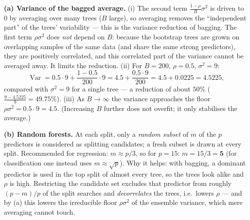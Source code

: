 \documentclass[11pt,a4paper]{article}
\begin{document}
\ifdefined\withsolutions
\begin{solutionbox}
\textbf{(a) Variance of the bagged average.}
(i) The second term $\frac{1-\rho}{B}\sigma^2$ is driven to $0$ by averaging over many trees
($B$ large), so averaging removes the ``independent part'' of the trees' variability ---
this is the variance reduction of bagging. The first term $\rho\sigma^2$ does \emph{not}
depend on $B$: because the bootstrap trees are grown on overlapping samples of the same data
(and share the same strong predictors), they are positively correlated, and this correlated
part of the variance cannot be averaged away. It limits the reduction.
(ii) For $B=200$, $\rho=0.5$, $\sigma^2=9$:
\[
  \operatorname{Var}=0.5\cdot 9+\frac{1-0.5}{200}\cdot 9
  =4.5+\frac{0.5\cdot 9}{200}=4.5+0.0225=\mathbf{4.5225},
\]
compared with $\sigma^2=9$ for a single tree --- a reduction of about $50\%$
($\tfrac{9-4.5225}{9}=49.75\%$).
(iii) As $B\to\infty$ the variance approaches the floor $\rho\sigma^2=0.5\cdot 9=\mathbf{4.5}$.
(Increasing $B$ further does not overfit; it only stabilises the average.)

\medskip
\textbf{(b) Random forests.}
At each split, only a \emph{random subset} of $m$ of the $p$ predictors is considered as
splitting candidates; a fresh subset is drawn at every split. Recommended for regression:
$m\approx p/3$, so for $p=15$: $m=15/3=\mathbf{5}$ (for classification one instead uses
$m\approx\sqrt{p}$).
Why it helps: with bagging, a dominant predictor is used in the top split of almost every tree,
so the trees look alike and $\rho$ is high. Restricting the candidate set excludes that
predictor from roughly $(p-m)/p$ of the split searches and \emph{decorrelates} the trees, i.e.\
lowers $\rho$ --- and by (a) this lowers the irreducible floor $\rho\sigma^2$ of the ensemble
variance, which mere averaging cannot touch.


\end{solutionbox}
\end{document}
